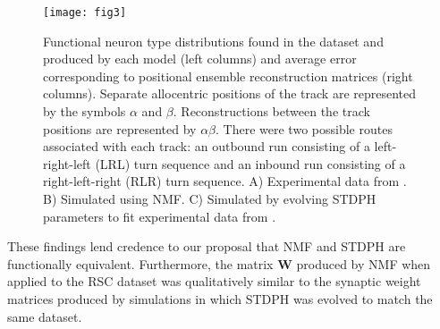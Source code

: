 \begin{figure}[ht]
	\centering
	\texttt{[image: fig3]}
    \caption{Functional neuron type distributions found in the dataset and produced by each model (left columns) and average error corresponding to positional ensemble reconstruction matrices (right columns). Separate allocentric positions of the track are represented by the symbols $\alpha$ and $\beta$. Reconstructions between the track positions are represented by $\alpha$$\beta$. There were two possible routes associated with each track: an outbound run consisting of a left-right-left (LRL) turn sequence and an inbound run consisting of a right-left-right (RLR) turn sequence. A) Experimental data from \cite{AlexanderNitz2015}. B) Simulated using NMF. C) Simulated by evolving STDPH parameters to fit experimental data from \cite{Rounds2016}.}
	\label{fig:NMF|RSC}
\end{figure} 



These findings lend credence to our proposal that \ac{NMF} and \ac{STDPH} 
are functionally equivalent.
Furthermore, the matrix \textbf{W} produced by \ac{NMF} when applied to the \ac{RSC} dataset was qualitatively similar to the synaptic weight matrices produced by 
simulations in which \ac{STDPH} was evolved to match the same dataset.



